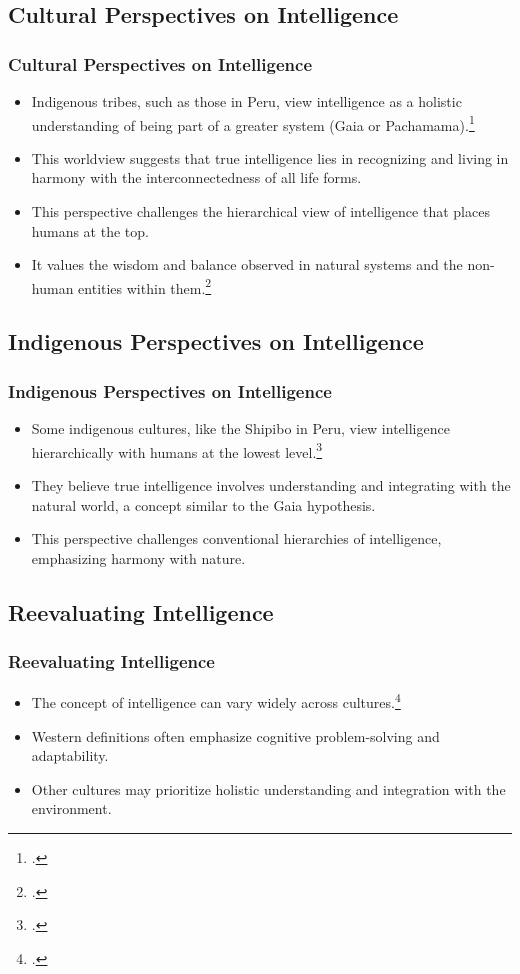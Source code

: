 \documentclass[10pt]{beamer}
\begin{document}
\subsection{Cultural Perspectives on Intelligence}
\begin{frame}
    \frametitle{Cultural Perspectives on Intelligence}
    \begin{itemize}
        \item Indigenous tribes, such as those in Peru, view intelligence as a holistic understanding of being part of a greater system (Gaia or Pachamama).\footcite{descola1996nature}
        \item This worldview suggests that true intelligence lies in recognizing and living in harmony with the interconnectedness of all life forms.
        \item This perspective challenges the hierarchical view of intelligence that places humans at the top.
        \item It values the wisdom and balance observed in natural systems and the non-human entities within them.\footcite{berkes1999sacred}
    \end{itemize}
\end{frame}

\subsection{Indigenous Perspectives on Intelligence}
\begin{frame}
    \frametitle{Indigenous Perspectives on Intelligence}
    \begin{itemize}
        \item Some indigenous cultures, like the Shipibo in Peru, view intelligence hierarchically with humans at the lowest level.\footcite{lovelock1972gaia}
        \item They believe true intelligence involves understanding and integrating with the natural world, a concept similar to the Gaia hypothesis.
        \item This perspective challenges conventional hierarchies of intelligence, emphasizing harmony with nature.
    \end{itemize}
\end{frame}

\subsection{Reevaluating Intelligence}
\begin{frame}
    \frametitle{Reevaluating Intelligence}
    \begin{itemize}
        \item The concept of intelligence can vary widely across cultures.\footcite{nisbett2003geography}
        \item Western definitions often emphasize cognitive problem-solving and adaptability.
        \item Other cultures may prioritize holistic understanding and integration with the environment.
    \end{itemize}
\end{frame}
\end{document}
